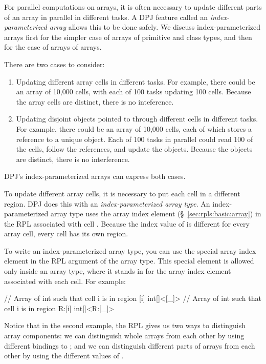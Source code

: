 For parallel computations on arrays, it is often necessary to update
different parts of an array in parallel in different tasks.  A DPJ
feature called an \emph{index-parameterized array} allows this to be
done safely.  We discuss index-parameterized arrays first for the
simpler case of arrays of primitive and class types, and then for the
case of arrays of arrays.

 There are two cases to
consider:
%
\begin{enumerate}
%
\item Updating different array cells in different tasks.  For example,
  there could be an array of 10,000 cells, with each of 100 tasks
  updating 100 cells.  Because the array cells are distinct, there is
  no inteference.
%
\item Updating disjoint objects pointed to through different cells in
  different tasks.  For example, there could be an array of 10,000
  cells, each of which stores a reference to a unique object.  Each of
  100 tasks in parallel could read 100 of the cells, follow the
  references, and update the objects.  Because the objects are
  distinct, there is no interference.
%
\end{enumerate}
%
DPJ's index-parameterized arrays can express both cases.

 To update different array
cells, it is necessary to put each cell in a different region.  DPJ
does this with an \emph{index-parameterized array type}.  An
index-parameterized array type uses the array index element \kwd{[i]}
(\S~\ref{sec:rpls:basic:array}) in the RPL associated with cell
.  Because the index value of  is different for every
array cell, every cell has its own region.

To write an index-parameterized array type, you can use the special
array index element \kwd{[\_]} in the RPL argument of the array type.
This special element is allowed only inside an array type, where it
stands in for the array index element \kwd{[i]} associated with each
cell.  For example:
%
\begin{dpjlisting}
// Array of int such that cell i is in region [i]
int[]<[_]>
// Array of int such that cell i is in region R:[i]
int[]<R:[_]>
\end{dpjlisting}
%
Notice that in the second example, the RPL  gives us two
ways to distinguish array components:  we can distinguish whole arrays
from each other by using different bindings to ; and we can
distinguish different parts of arrays from each other by using the
different values of .

